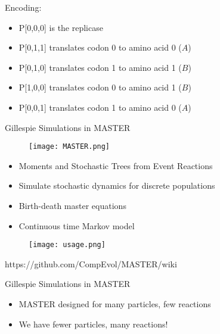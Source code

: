 \documentclass{beamer}
\begin{document}
\begin{frame}
Encoding:

\begin{itemize}
\item P[0,0,0] is the replicase
\item P[0,1,1] translates codon 0 to amino acid 0 ($A$)
\item P[0,1,0] translates codon 1 to amino acid 1 ($B$)
\item P[1,0,0] translates codon 0 to amino acid 1 ($B$) 
\item P[0,0,1] translates codon 1 to amino acid 0 ($A$)
\end{itemize}
\end{frame}




\begin{frame}{Gillespie Simulations in MASTER}{}
  \begin{figure}
      \centering
       \texttt{[image: MASTER.png]}
   \end{figure}
   
   \begin{itemize}
   \item Moments and Stochastic Trees from Event Reactions
   \item Simulate stochastic dynamics for discrete populations
   \item Birth-death master equations
   \item Continuous time Markov model
   \end{itemize}
\end{frame}

\begin{frame}
  \begin{figure}
      \centering
       \texttt{[image: usage.png]}
   \end{figure}
\centering 
\tiny https://github.com/CompEvol/MASTER/wiki
\end{frame}

\begin{frame}{Gillespie Simulations in MASTER}{}
  \begin{itemize}
  \item MASTER designed for many particles, few reactions
  \item We have fewer particles, many reactions!
  \end{itemize}
\end{frame}
\end{document}
